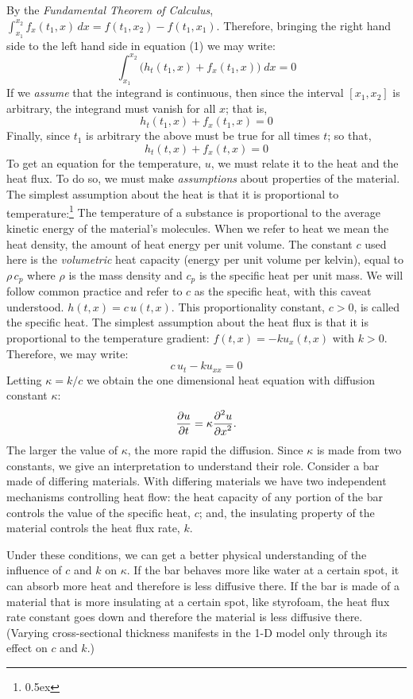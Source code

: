 By the {\it Fundamental Theorem of Calculus\/}, 
$\int_{x_1}^{x_2} f_x(t_1, x) \, dx = f(t_1, x_2) - f(t_1, x_1)$.
Therefore, bringing the right hand side to the left hand side in equation 
(1) we may write:
$$
\int_{x_1}^{x_2} \big( h_t(t_1,x) + f_x(t_1,x) \big) \; dx = 0
$$
If we {\it assume\/} that the integrand is continuous, then since the 
interval $[x_1, x_2]$ is arbitrary, the integrand must 
vanish for all $x$; that is,
$$
h_t(t_1,x) + f_x(t_1,x) = 0
$$
Finally, since $t_1$ is arbitrary the above must be true for all times $t$;
so that,
$$
h_t(t,x) + f_x(t,x) = 0
$$
To get an equation for the temperature, $u$, we must relate it to 
the heat and the heat flux. To do so, we must make 
{\it assumptions\/} about properties of the material.
The simplest assumption about the heat is that it is
proportional to temperature:\footnote{\raise 0.5ex \hbox{\ddag}}{%
The temperature of a substance is proportional to the average kinetic energy of the
material's molecules. When we refer to heat we mean the heat density, the
amount of heat energy per unit volume. The constant $c$ used here is the
{\it volumetric\/} heat capacity (energy per unit volume per kelvin),
equal to $\rho \, c_p$ where $\rho$ is the mass density and $c_p$ is the
specific heat per unit mass. We will follow common practice and refer to
$c$ as the specific heat, with this caveat understood.}
$h(t,x) = c \, u(t,x)$.
This proportionality constant, $c > 0$, is called the specific heat.
The simplest assumption about the heat flux is that it is proportional 
to the temperature gradient:
$f(t,x) = - k u_x(t,x)$ with $k > 0$. 
Therefore, we may write:
$$
c \, u_t - k u_{xx} = 0
$$
Letting $\kappa = k / c$ we obtain the one dimensional heat equation 
with diffusion constant $\kappa$:
$$
{{\displaystyle \partial u} \over {\displaystyle \partial t}} = \kappa {{\displaystyle \partial^2 u} \over {\displaystyle \partial x^2}}.
$$
The larger the value of $\kappa$, the more rapid the diffusion. Since 
$\kappa$ is made from two constants, we give an interpretation to understand
their role. Consider a bar made of differing materials.
With differing materials we have two independent mechanisms controlling heat flow:
the heat capacity of any portion of the bar controls the value of the
specific heat, $c$; and, the insulating property of the material controls the heat flux rate, $k$.

Under these conditions, we can get a better physical
understanding of the influence
of $c$ and $k$ on $\kappa$. If the bar behaves more like water at a certain
spot, it can absorb more heat and therefore is less diffusive there.
If the bar is made of a material that is more
insulating at a certain spot, like styrofoam, the heat flux rate constant
goes down and therefore the material is less diffusive there. (Varying
cross-sectional thickness manifests in the 1-D model only through its
effect on $c$ and $k$.)

